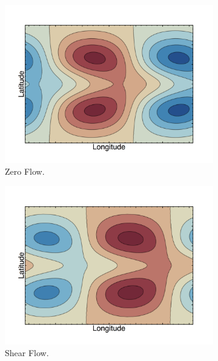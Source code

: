 \begin{figure}
  \centering
  \begin{subfigure}[b]{0.24\textwidth}
    \includegraphics[width=\textwidth]{figures/wave-mean-flow/expl-non-shifted-matsuno.png}
    \caption{Zero Flow.}
    \label{fig:expl-non-shifted-matsuno}
  \end{subfigure}
  \begin{subfigure}[b]{0.24\textwidth}
    \includegraphics[width=\textwidth]{figures/wave-mean-flow/expl-shifted-matsuno.png}
    \caption{Shear Flow.}
    \label{fig:expl-shifted-matsuno}
  \end{subfigure}
  \begin{subfigure}[b]{0.24\textwidth}

\end{subfigure}
\end{figure}
